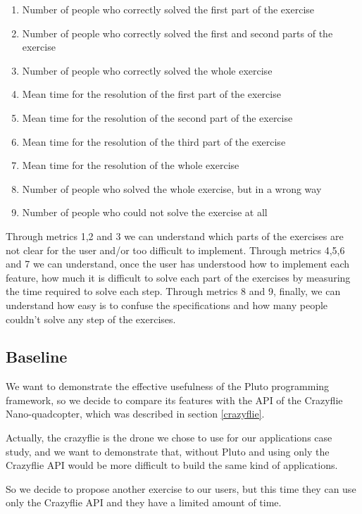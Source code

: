 \begin{enumerate}
\item {Number of people who correctly solved the first part of the exercise}
\item {Number of people who correctly solved the first and second parts of the exercise}
\item {Number of people who correctly solved the whole exercise}
\item {Mean time for the resolution of the first part of the exercise}
\item {Mean time for the resolution of the second part of the exercise}
\item {Mean time for the resolution of the third part of the exercise}
\item {Mean time for the resolution of the whole exercise}
\item {Number of people who solved the whole exercise, but in a wrong way}
\item {Number of people who could not solve the exercise at all}
\end{enumerate}

Through metrics 1,2 and 3 we can understand which parts of the exercises are not clear for the user and/or too difficult to implement. 
Through metrics 4,5,6 and 7 we can understand, once the user has understood how to implement each feature, how much it is difficult to solve each part of the exercises by measuring the time required to solve each step.
Through metrics 8 and 9, finally, we can understand how easy is to confuse the specifications and how many people couldn't solve any step of the exercises.


\subsection{Baseline}\label{baseline}

We want to demonstrate the effective usefulness of the Pluto programming framework, so we decide to compare its features with the API of the Crazyflie Nano-quadcopter, which was described in section \ref{crazyflie}.

Actually, the crazyflie is the drone we chose to use for our applications case study, and we want to demonstrate that, without Pluto and using only the Crazyflie API would be more difficult to build the same kind of applications.

So we decide to propose another exercise to our users, but this time they can use only the Crazyflie API and they have a limited amount of time.


